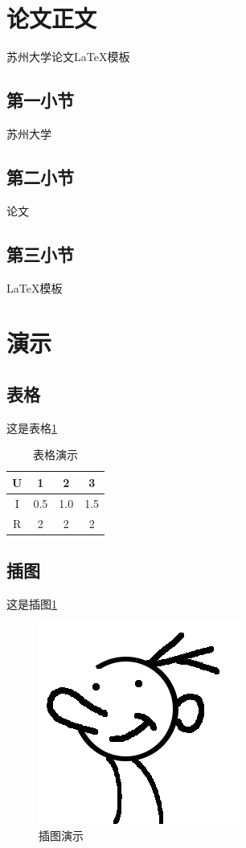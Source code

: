 \section{论文正文}
苏州大学论文LaTeX模板
\subsection{第一小节}
苏州大学
\subsection{第二小节}
论文
\subsection{第三小节}
LaTeX模板

\section{演示}
\subsection{表格}
这是表格\ref{table1}
\begin{table}[!hb]
\caption{表格演示}
\label{table1}
\begin{center}
\begin{tabular}{c||c|c|c}\hline
U & 1 & 2 & 3\\\hline
I & 0.5 & 1.0 & 1.5\\\hline
R & 2 & 2 & 2\\\hline
\end{tabular}
\end{center}
\end{table}

\subsection{插图}
这是插图\ref{pic1}
\begin{figure}[!hb]
\caption{插图演示}
\label{pic1}
\centering
\includegraphics[scale=0.5]{image/pic.png}
\end{figure}
